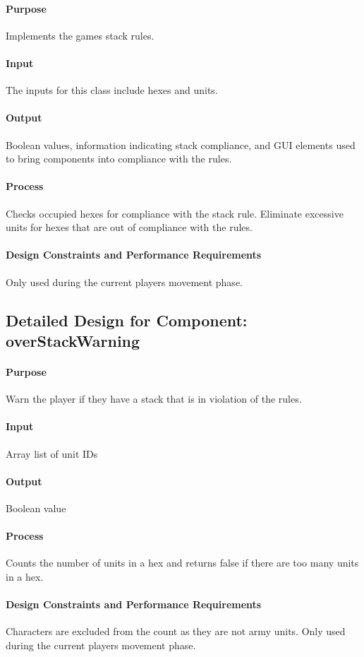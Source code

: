 \documentclass[12pt,a4paper,titlepage]{article}
\begin{document}
\paragraph{Purpose} Implements the games stack rules.
\paragraph{Input} The inputs for this class include hexes and units.
\paragraph{Output} Boolean values, information indicating stack compliance, and GUI elements used to bring components into compliance with the rules.
\paragraph{Process} Checks occupied hexes for compliance with the stack rule. Eliminate excessive units for hexes that are out of compliance with the rules.
\paragraph{Design Constraints and Performance Requirements} Only used during the current players movement phase. 

\subsection{Detailed Design for Component: overStackWarning}
\paragraph{Purpose} Warn the player if they have a stack that is in violation of the rules.
\paragraph{Input} Array list of unit IDs
\paragraph{Output} Boolean value
\paragraph{Process} Counts the number of units in a hex and returns false if there are too many units in a hex.
\paragraph{Design Constraints and Performance Requirements} Characters are excluded from the count as they are not army units.  Only used during the current players movement phase.
\end{document}
